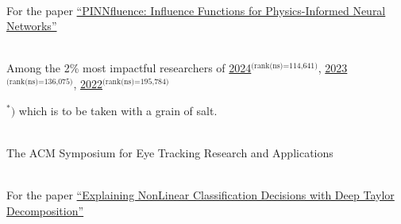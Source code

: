 
{
    \ifdefined\shortcv
        {}
    \else
        {
            \\
            \hspace*{\fill} For the paper
            \href{https://ml4physicalsciences.github.io/2024/files/NeurIPS_ML4PS_2024_254.pdf}{``PINNfluence: Influence Functions for Physics-Informed Neural Networks''}
        }
    \fi
}

{
    \ifdefined\shortcv
        {}
    \else
        {
            \\
            Among the 2\% most impactful researchers of
            \href{https://elsevier.digitalcommonsdata.com/datasets/btchxktzyw/7}{2024}$^\text{(rank(ns)=114,641)}$,
            \href{https://elsevier.digitalcommonsdata.com/datasets/btchxktzyw/6}{2023}$^\text{(rank(ns)=136,075)}$,
            \href{https://elsevier.digitalcommonsdata.com/datasets/btchxktzyw/4}{2022}$^\text{(rank(ns)=195,784)}$\phantom{,}

            
            
            \qquad $^\ast )$
            which is to be taken with a grain of salt.
        }
    \fi
}



{
    \ifdefined\shortcv
        {}
    \else
        {   \\
            The ACM Symposium for Eye Tracking Research and Applications
        }
    \fi
}



{
    \ifdefined\shortcv
        {}
    \else
        {
            \\
            For the paper
            \href{https://doi.org/10.1016/j.patcog.2016.11.008}{``Explaining NonLinear Classification Decisions with Deep Taylor Decomposition''}
        }
    \fi
}


